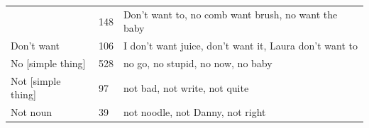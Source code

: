 \documentclass[man,floatsintext,draftall]{apa6}
\begin{document}
\begin{longtable}[]{@{}lll@{}}
\begin{minipage}[t]{0.27\columnwidth}
\end{minipage} & \begin{minipage}[t]{0.16\columnwidth}\raggedright\strut
148\strut
\end{minipage} & \begin{minipage}[t]{0.39\columnwidth}\raggedright\strut
Don't want to, no comb want brush, no want the baby\strut
\end{minipage}\tabularnewline
\begin{minipage}[t]{0.27\columnwidth}\raggedright\strut
Don't want\strut
\end{minipage} & \begin{minipage}[t]{0.16\columnwidth}\raggedright\strut
106\strut
\end{minipage} & \begin{minipage}[t]{0.39\columnwidth}\raggedright\strut
I don't want juice, don't want it, Laura don't want to\strut
\end{minipage}\tabularnewline
\begin{minipage}[t]{0.27\columnwidth}\raggedright\strut
No {[}simple thing{]}\strut
\end{minipage} & \begin{minipage}[t]{0.16\columnwidth}\raggedright\strut
528\strut
\end{minipage} & \begin{minipage}[t]{0.39\columnwidth}\raggedright\strut
no go, no stupid, no now, no baby\strut
\end{minipage}\tabularnewline
\begin{minipage}[t]{0.27\columnwidth}\raggedright\strut
Not {[}simple thing{]}\strut
\end{minipage} & \begin{minipage}[t]{0.16\columnwidth}\raggedright\strut
97\strut
\end{minipage} & \begin{minipage}[t]{0.39\columnwidth}\raggedright\strut
not bad, not write, not quite\strut
\end{minipage}\tabularnewline
\begin{minipage}[t]{0.27\columnwidth}\raggedright\strut
Not noun\strut
\end{minipage} & \begin{minipage}[t]{0.16\columnwidth}\raggedright\strut
39\strut
\end{minipage} & \begin{minipage}[t]{0.39\columnwidth}\raggedright\strut
not noodle, not Danny, not right\strut
\end{minipage}\tabularnewline

\end{longtable}
\end{document}
